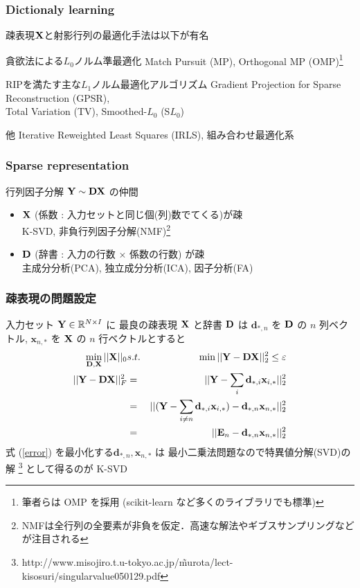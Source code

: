 \begin{frame}\frametitle{Dictionaly learning}
疎表現${\mathbf{X}}$と射影行列の最適化手法は以下が有名
\begin{block}{貪欲法による$L_0$ノルム準最適化}
        Match Pursuit (MP),
        Orthogonal MP (OMP)\footnote{筆者らは OMP を採用 (scikit-learn など多くのライブラリでも標準)}
\end{block}
\begin{block}{RIPを満たす主な$L_1$ノルム最適化アルゴリズム}
        Gradient Projection for Sparse Reconstruction (GPSR),\\
        Total Variation (TV),
        Smoothed-$L_0$ (S$L_0$)
\end{block}
\begin{block}{他}
Iterative Reweighted Least Squares (IRLS), 組み合わせ最適化系
\end{block}
\end{frame}


\begin{frame}\frametitle{Sparse representation}
行列因子分解 ${\mathbf{Y}} \sim {\mathbf{D}} {\mathbf{X}}$ の仲間 \cite{Murata2012}
\begin{itemize}
  \item ${\mathbf{X}}$ (係数 : 入力セットと同じ個(列)数でてくる)が疎\\
    K-SVD, 非負行列因子分解(NMF)\footnote{NMFは全行列の全要素が非負を仮定．高速な解法やギブスサンプリングなどが注目される}
  \item ${\mathbf{D}}$ (辞書 : 入力の行数 $\times$ 係数の行数) が疎\\
    主成分分析(PCA), 独立成分分析(ICA), 因子分析(FA)
\end{itemize}
\end{frame}


\begin{frame}\frametitle{疎表現の問題設定}
\label{ksvd}
入力セット ${\mathbf{Y}} \in {\mathbb{R}^{N\times I}}$ に
最良の疎表現 ${\mathbf{X}}$ と辞書 ${\mathbf{D}}$ は
$\mathbf{d}_{*,n}$ を ${\mathbf{D}}$ の $n$ 列ベクトル,
$\mathbf{x}_{n,*}$ を ${\mathbf{X}}$ の $n$ 行ベクトルとすると
\begin{eqnarray}
    \min_{{\mathbf{D}}, {\mathbf{X}}} ||{\mathbf{X}}||_0
    &s.t.& \min ||{\mathbf{Y}}-{\mathbf{D}}{\mathbf{X}}||^2_2 \leq \varepsilon \\
    ||{\mathbf{Y}}-{\mathbf{D}}{\mathbf{X}}||^2_F &=&
    ||{\mathbf{Y}} - \sum_{i} \mathbf{d}_{*,i} \mathbf{x}_{i,*}||^2_2 \\
    &=& ||({\mathbf{Y}} - \sum_{i \neq n} \mathbf{d}_{*,i} \mathbf{x}_{i,*}) - \mathbf{d}_{*,n} \mathbf{x}_{n,*}||^2_2 \\
    &=& ||\mathbf{E}_n - \mathbf{d}_{*,n} \mathbf{x}_{n,*}||^2_2 \label{error}
\end{eqnarray}
式 (\ref{error}) を最小化する$\mathbf{d}_{*,n}, \mathbf{x}_{n,*}$ は
最小二乗法問題なので特異値分解(SVD)の解
\footnote{http://www.misojiro.t.u-tokyo.ac.jp/\~murota/lect-kisosuri/singularvalue050129.pdf}
として得るのが K-SVD
\end{frame}


